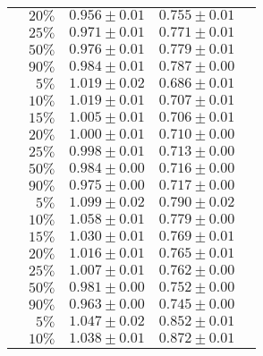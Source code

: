 \begin{longtable}{lrccc}
                        & $20\%$                      & $0.956 \pm 0.01$ & $0.755 \pm 0.01$ \\
                        & $25\%$                      & $0.971 \pm 0.01$ & $0.771 \pm 0.01$ \\
                        & $50\%$                      & $0.976 \pm 0.01$ & $0.779 \pm 0.01$ \\
                        & $90\%$                      & $0.984 \pm 0.01$ & $0.787 \pm 0.00$ \\
\midrule
\multirow{5}{*}{\sla{}} & $5\%$                       & $1.019 \pm 0.02$ & $0.686 \pm 0.01$ \\
                        & $10\%$                      & $1.019 \pm 0.01$ & $0.707 \pm 0.01$ \\
                        & $15\%$                      & $1.005 \pm 0.01$ & $0.706 \pm 0.01$ \\
                        & $20\%$                      & $1.000 \pm 0.01$ & $0.710 \pm 0.00$ \\
                        & $25\%$                      & $0.998 \pm 0.01$ & $0.713 \pm 0.00$ \\
                        & $50\%$                      & $0.984 \pm 0.00$ & $0.716 \pm 0.00$ \\
                        & $90\%$                      & $0.975 \pm 0.00$ & $0.717 \pm 0.00$ \\
\midrule
\multirow{5}{*}{\epi{}} & $5\%$                       & $1.099 \pm 0.02$ & $0.790 \pm 0.02$ \\
                        & $10\%$                      & $1.058 \pm 0.01$ & $0.779 \pm 0.00$ \\
                        & $15\%$                      & $1.030 \pm 0.01$ & $0.769 \pm 0.01$ \\
                        & $20\%$                      & $1.016 \pm 0.01$ & $0.765 \pm 0.01$ \\
                        & $25\%$                      & $1.007 \pm 0.01$ & $0.762 \pm 0.00$ \\
                        & $50\%$                      & $0.981 \pm 0.00$ & $0.752 \pm 0.00$ \\
                        & $90\%$                      & $0.963 \pm 0.00$ & $0.745 \pm 0.00$ \\
\midrule
\multirow{5}{*}{\kiw{}} & $5\%$                       & $1.047 \pm 0.02$ & $0.852 \pm 0.01$ \\
                        & $10\%$                      & $1.038 \pm 0.01$ & $0.872 \pm 0.01$ \\

\end{longtable}
